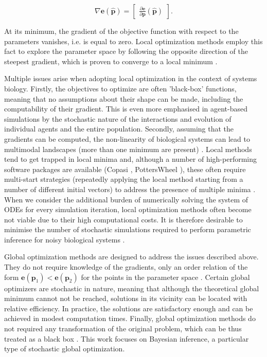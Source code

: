 \documentclass[bsc,frontabs,singlespacing,parskip,deptreport]{infthesis}
\begin{document}
\begin{equation}
    \nabla \textbf{e}(\mathbf{\hat{p}}) = 
    \begin{bmatrix}
      \frac{\partial \textbf{e}}{\partial \textbf{p}} (\mathbf{\hat{p}})  
    \end{bmatrix}.
\end{equation}

At its minimum, the gradient of the objective function with respect to the parameters vanishes, i.e. is equal to zero. Local optimization methods employ this fact to explore the parameter space by following the opposite direction of the steepest gradient, which is proven to converge to a local minimum \cite{Curry1944TheMO}. 

Multiple issues arise when adopting local optimization in the context of systems biology. Firstly, the objectives to optimize are often 'black-box' functions, meaning that no assumptions about their shape can be made, including the computability of their gradient. This is even more emphasised in agent-based simulations by the stochastic nature of the interactions and evolution of individual agents and the entire population. Secondly, assuming that the gradients can be computed, the non-linearity of biological systems can lead to multimodal landscapes (more than one minimum are present) \cite{article}. Local methods tend to get trapped in local minima and, although a number of high-performing software packages are available (Copasi \cite{hoops2006copasi}, PottersWheel \cite{maiwald2008dynamical}), these often require multi-start strategies (repeatedly applying the local method starting from a number of different initial vectors) to address the presence of multiple minima \cite{10.3389/fams.2019.00055}. When we consider the additional burden of numerically solving the system of ODEs for every simulation iteration, local optimization methods often become not viable due to their high computational costs. It is therefore desirable to minimise the number of stochastic simulations required to perform parametric inference for noisy biological systems \cite{https://doi.org/10.48550/arxiv.1403.8057}.

Global optimization methods are designed to address the issues described above. They do not require knowledge of the gradients, only an order relation of the form $\textbf{e}(\textbf{p}_{1}) < \textbf{e}(\textbf{p}_{2})$ for the points in the parameter space \cite{pmid19215296}. Certain global optimizers are stochastic in nature, meaning that although the theoretical global minimum cannot not be reached, solutions in its vicinity can be located with relative efficiency. In practice, the solutions are satisfactory enough and can be achieved in modest computation times. Finally, global optimization methods do not required any transformation of the original problem, which can be thus treated as a black box \cite{pmid14559783}. This work focuses on Bayesian inference, a particular type of stochastic global optimization.
\end{document}
